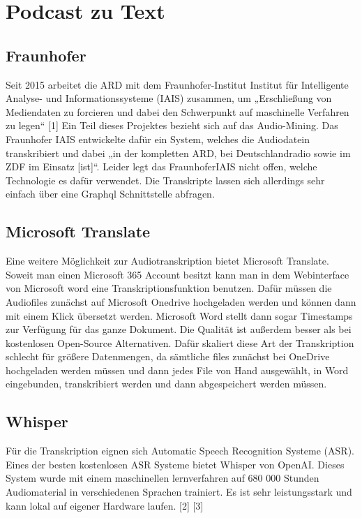 \section{Podcast zu Text}


\subsection{Fraunhofer}

Seit 2015 arbeitet die ARD mit dem Fraunhofer-Institut Institut für Intelligente Analyse- und Informationssysteme (IAIS) zusammen, um „Erschließung von Mediendaten zu forcieren und dabei den Schwerpunkt auf maschinelle Verfahren zu legen“ [1]
Ein Teil dieses Projektes bezieht sich auf das Audio-Mining. 
Das Fraunhofer IAIS entwickelte dafür ein System, welches die Audiodatein transkribiert und dabei „in der kompletten ARD, bei Deutschlandradio sowie im ZDF im Einsatz [ist]“. 
Leider legt das FraunhoferIAIS nicht offen, welche Technologie es dafür verwendet. 
Die Transkripte lassen sich allerdings sehr einfach über eine Graphql Schnittstelle abfragen. 

\subsection{Microsoft Translate}


Eine weitere Möglichkeit zur Audiotranskription bietet Microsoft Translate. 
Soweit man einen Microsoft 365 Account besitzt kann man in dem Webinterface von Microsoft word eine Transkriptionsfunktion benutzen. 
Dafür müssen die Audiofiles zunächst auf Microsoft Onedrive hochgeladen werden und können dann mit einem Klick übersetzt werden. 
Microsoft Word stellt dann sogar Timestamps  zur Verfügung für das ganze Dokument. 
Die Qualität ist außerdem besser als bei kostenlosen Open-Source Alternativen. 
Dafür skaliert diese Art der Transkription schlecht für größere Datenmengen, da sämtliche files zunächst bei OneDrive hochgeladen werden müssen und dann jedes File von Hand ausgewählt, in Word eingebunden, transkribiert werden und dann abgespeichert werden müssen. 

\subsection{Whisper}

Für die Transkription eignen sich Automatic Speech Recognition Systeme (ASR). 
Eines der besten kostenlosen ASR Systeme bietet Whisper von OpenAI. 
Dieses System wurde mit einem maschinellen lernverfahren auf 680 000 Stunden Audiomaterial in verschiedenen Sprachen trainiert. 
Es ist sehr leistungsstark und kann lokal auf eigener Hardware laufen. [2] [3]

